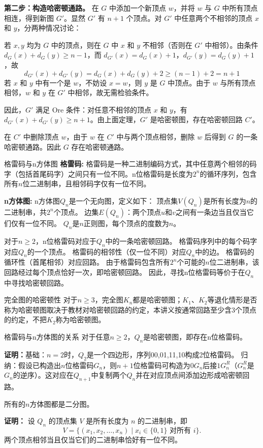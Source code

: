     \textbf{第二步：构造哈密顿通路。}
    在 $G$ 中添加一个新顶点 $w$，并将 $w$ 与 $G$ 中所有顶点相连，得到新图 $G'$。显然 $G'$ 有 $n+1$ 个顶点。对 $G'$ 中任意两个不相邻的顶点 $x$ 和 $y$，分两种情况讨论：
         
    若 $x, y$ 均为 $G$ 中的顶点，则在 $G$ 中 $x$ 和 $y$ 不相邻（否则在 $G'$ 中相邻）。由条件 $d_G(x) + d_G(y) \ge n-1$，而 $d_{G'}(x) = d_G(x) + 1$，$d_{G'}(y) = d_G(y) + 1$，故
        \[
        d_{G'}(x) + d_{G'}(y) = d_G(x) + d_G(y) + 2 \ge (n-1) + 2 = n+1
        \]
         若 $x$ 和 $y$ 中有一个是 $w$，不妨设 $x = w$，则 $y$ 是 $G$ 中顶点。由于 $w$ 与所有顶点相邻，$w$ 和 $y$ 在 $G'$ 中相邻，故无需检验条件。

    因此，$G'$ 满足 Ore 条件：对任意不相邻的顶点 $x$ 和 $y$，有 $d_{G'}(x) + d_{G'}(y) \ge n+1$。由上面定理，$G'$ 是哈密顿图，存在哈密顿回路 $C'$。

    在 $C'$ 中删除顶点 $w$，由于 $w$ 在 $C'$ 中与两个顶点相邻，删除 $w$ 后得到 $G$ 的一条哈密顿通路。因此 $G$ 存在哈密顿通路。
\begin{definition}{格雷码与n方体图}{}
\textbf{格雷码:}
格雷码是一种二进制编码方式，其中任意两个相邻的码字（包括首尾码字）之间只有一位不同。n位格雷码是长度为$2^n$的循环序列，包含所有$n$位二进制串，且相邻码字仅有一位不同。

\textbf{n方体图:}
n方体图$Q_n$是一个无向图，定义如下：
顶点集$V(Q_n)$是所有长度为$n$的二进制串，共$2^n$个顶点。  
边集$E(Q_n)$：两个顶点$u$和$v$之间有一条边当且仅当它们仅有一位不同。  
$Q_n$是$n$正则图，每个顶点的度数为$n$。
\end{definition}
对于$n\geqslant 2$，n位格雷码对应于$Q_n$中的一条哈密顿回路。  
格雷码序列中的每个码字对应$Q_n$的一个顶点。  
格雷码的相邻性（仅一位不同）对应$Q_n$中的边。  
格雷码的循环性（首尾相邻）对应回路。  
由于格雷码包含所有$2^n$个可能的$n$位二进制串，该回路经过每个顶点恰好一次，即哈密顿回路。  
因此，寻找n位格雷码等价于在$Q_n$中寻找哈密顿回路。
\begin{theorem}{完全图的哈密顿性}{}
    对于$n\geqslant3$，完全图$K_n$都是哈密顿图；$K_1$、$K_2$等退化情形是否称为哈密顿图取决于教材对哈密顿回路的约定，本讲义按通常回路至少含3个顶点的约定，不把$K_2$称为哈密顿图。
\end{theorem}
\begin{theorem}{格雷码与n方体图的关系}{}
    对于任意$n \geqslant 2$，$Q_n$是哈密顿图，即存在n位格雷码。
\end{theorem}
\textbf{证明：}基础：$n=2$时，$Q_2$是一个四边形，序列00,01,11,10构成2位格雷码。  
归纳：假设已构造出$n$位格雷码$G_n$，则$n+1$位格雷码可构造为$0G_n$后接$1G_n^R$（$G_n^R$是$G_n$的逆序）。这对应在$Q_{n+1}$中复制两个$Q_n$并在对应顶点间添加边形成哈密顿回路。
\begin{theorem}{}{}
    所有的$n$方体图都是二分图。
\end{theorem}
\textbf{证明：}
    设 $Q_n$ 的顶点集 $V$ 是所有长度为 $n$ 的二进制串，即
    \[
    V = \{ (x_1, x_2, \dots, x_n) \mid x_i \in \{0, 1\} \text{ 对所有 } i \}.
    \]
    两个顶点相邻当且仅当它们的二进制串恰好有一位不同。

